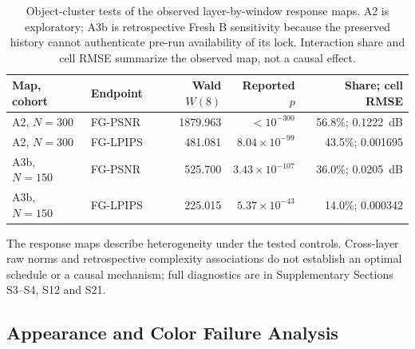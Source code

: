 \documentclass[times,twocolumn,final]{elsarticle}
\providecommand{\DIFadd}[1]{{\protect\color{blue} \sf #1}} %
\providecommand{\DIFaddbegin}{} %
\providecommand{\DIFaddend}{} %
\providecommand{\DIFaddFL}[1]{\DIFadd{#1}} %
\providecommand{\DIFaddbeginFL}{\DIFaddbegin} %
\providecommand{\DIFaddendFL}{\DIFaddend} %
\renewcommand{\DIFaddbeginFL}{}
\renewcommand{\DIFaddendFL}{}
\renewcommand{\DIFaddFL}[1]{#1}
\begin{document}
\begin{table}[t]
\centering
  \DIFaddbeginFL \scriptsize
\setlength{\tabcolsep}{3pt}
\caption{Object-cluster tests of the observed layer-by-window response maps. A2 is exploratory; A3b is retrospective Fresh B sensitivity because the preserved history cannot authenticate pre-run availability of its lock. Interaction share and cell RMSE summarize the observed map, not a causal effect.}
\label{tab:layerwindow-main}
\begin{tabular}{llrrr}
\DIFaddendFL \toprule
  \DIFaddbeginFL \DIFaddFL{Map, cohort }\DIFaddendFL &   \DIFaddbeginFL \DIFaddFL{Endpoint }\DIFaddendFL &   \DIFaddbeginFL \DIFaddFL{Wald $W(8)$ }\DIFaddendFL &   \DIFaddbeginFL \DIFaddFL{Reported $p$ }& \DIFaddFL{Share; cell RMSE }\DIFaddendFL \\
\midrule
  \DIFaddbeginFL \DIFaddFL{A2, $N=300$ }\DIFaddendFL &   \DIFaddbeginFL \DIFaddFL{FG-PSNR }\DIFaddendFL &   \DIFaddbeginFL \DIFaddFL{1879.963 }\DIFaddendFL &   \DIFaddbeginFL \DIFaddFL{$<10^{-300}$ }& \DIFaddFL{56.8\%; 0.1222~dB }\DIFaddendFL \\
  \DIFaddbeginFL \DIFaddFL{A2, $N=300$ }\DIFaddendFL &   \DIFaddbeginFL \DIFaddFL{FG-LPIPS }\DIFaddendFL &   \DIFaddbeginFL \DIFaddFL{481.081 }\DIFaddendFL &   \DIFaddbeginFL \DIFaddFL{$8.04\times10^{-99}$ }& \DIFaddFL{43.5\%; 0.001695 }\DIFaddendFL \\
  \DIFaddbeginFL \DIFaddFL{A3b, $N=150$ }\DIFaddendFL &   \DIFaddbeginFL \DIFaddFL{FG-PSNR }\DIFaddendFL &   \DIFaddbeginFL \DIFaddFL{525.700 }\DIFaddendFL &   \DIFaddbeginFL \DIFaddFL{$3.43\times10^{-107}$ }& \DIFaddFL{36.0\%; 0.0205~dB }\\
\DIFaddFL{A3b, $N=150$ }& \DIFaddFL{FG-LPIPS }& \DIFaddFL{225.015 }& \DIFaddFL{$5.37\times10^{-43}$ }& \DIFaddFL{14.0\%; 0.000342 }\DIFaddendFL \\
\bottomrule
\end{tabular}
\end{table}

  \DIFaddbegin \DIFadd{The response maps describe heterogeneity under the tested controls. Cross-layer raw norms and retrospective complexity associations do not establish an optimal schedule or a causal mechanism; full diagnostics are in Supplementary Sections S3--S4, S12 and S21}\DIFaddend .

\DIFaddbegin \subsection{Appearance and Color Failure Analysis}
\label{subsec:appearance-color}
\end{document}
